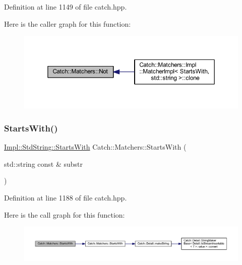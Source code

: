 Definition at line 1149 of file catch.\+hpp.

Here is the caller graph for this function\+:\nopagebreak
\begin{figure}[H]
\begin{center}
\leavevmode
\includegraphics[width=350pt]{namespace_catch_1_1_matchers_ae3c192dc15c973c38f07376d4debdc34_icgraph}
\end{center}
\end{figure}
\hypertarget{namespace_catch_1_1_matchers_a9b6a7704df7d0717dc6686fd2055ffea}{}\label{namespace_catch_1_1_matchers_a9b6a7704df7d0717dc6686fd2055ffea} 
\subsubsection{\texorpdfstring{Starts\+With()}{StartsWith()}\hspace{0.1cm}{\footnotesize\ttfamily [1/2]}}
{\footnotesize\ttfamily \hyperlink{struct_catch_1_1_matchers_1_1_impl_1_1_std_string_1_1_starts_with}{Impl\+::\+Std\+String\+::\+Starts\+With} Catch\+::\+Matchers\+::\+Starts\+With (\begin{DoxyParamCaption}\item[{std\+::string const \&}]{substr }\end{DoxyParamCaption})\hspace{0.3cm}{\ttfamily [inline]}}



Definition at line 1188 of file catch.\+hpp.

Here is the call graph for this function\+:\nopagebreak
\begin{figure}[H]
\begin{center}
\leavevmode
\includegraphics[width=350pt]{namespace_catch_1_1_matchers_a9b6a7704df7d0717dc6686fd2055ffea_cgraph}
\end{center}
\end{figure}
\hypertarget{namespace_catch_1_1_matchers_a031985c11b8c8bb62585b3904f9fd2b0}{}\label{namespace_catch_1_1_matchers_a031985c11b8c8bb62585b3904f9fd2b0} 
